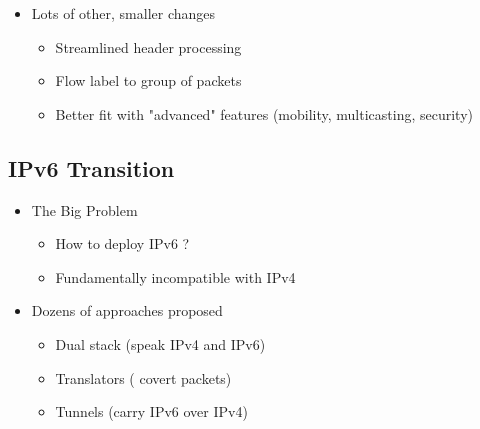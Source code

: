 \documentclass[12pt]{ctexart}   %
\begin{document}
\begin{itemize}
		 \item Lots of other, smaller changes
		 \begin{itemize}
		 	\item Streamlined header processing
		 	\item Flow label to group of packets
		 	\item Better fit with "advanced" features (mobility, multicasting, security)
		 \end{itemize}
		 
	\end{itemize}
	
	\subsection{IPv6 Transition}
	\begin{itemize}
		\item The Big Problem
		\begin{itemize}
			\item How to deploy IPv6 ?
			\item Fundamentally incompatible with IPv4
		\end{itemize}
		
		\item Dozens of approaches proposed
		\begin{itemize}
			\item Dual stack (speak IPv4 and IPv6)
			\item Translators ( covert packets)
			\item Tunnels (carry IPv6 over IPv4)
		\end{itemize}
	\end{itemize}
	
\end{document}
